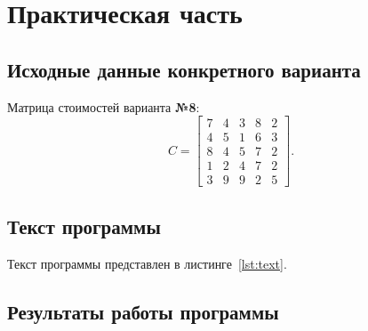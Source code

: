 \chapter{Практическая часть}

\section{Исходные данные конкретного варианта}

Матрица стоимостей варианта \textbf{№8}:
$$
    C = 
    \begin{bmatrix}
        7 & 4 & 3 & 8 & 2 \\
        4 & 5 & 1 & 6 & 3 \\
        8 & 4 & 5 & 7 & 2 \\
        1 & 2 & 4 & 7 & 2 \\
        3 & 9 & 9 & 2 & 5
    \end{bmatrix}. 
$$

\section{Текст программы}

Текст программы представлен в листинге~\ref{lst:text}. 


\section{Результаты работы программы}

